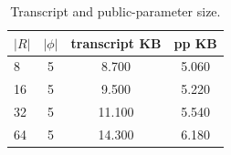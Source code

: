\begin{table}[htbp]
\centering
\caption{Transcript and public-parameter size.}
\label{tab:size}
\begin{tabular}{@{}lccc@{}}
\toprule
$|R|$ & $|\phi|$ & transcript KB & pp KB \\
\midrule
8 & 5 & 8.700 & 5.060 \\
16 & 5 & 9.500 & 5.220 \\
32 & 5 & 11.100 & 5.540 \\
64 & 5 & 14.300 & 6.180 \\
\bottomrule
\end{tabular}
\end{table}
